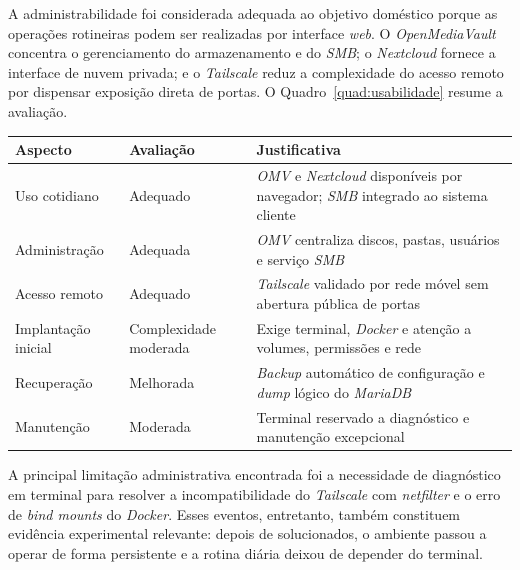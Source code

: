 A administrabilidade foi considerada adequada ao objetivo doméstico porque as operações rotineiras podem ser realizadas por interface \textit{web}. O \textit{OpenMediaVault} concentra o gerenciamento do armazenamento e do \textit{SMB}; o \textit{Nextcloud} fornece a interface de nuvem privada; e o \textit{Tailscale} reduz a complexidade do acesso remoto por dispensar exposição direta de portas. O Quadro~\ref{quad:usabilidade} resume a avaliação.

\begin{quadro}[H]
    \centering
    \small
    \renewcommand{\arraystretch}{1.15}
    \begin{tabularx}{\linewidth}{|>{\raggedright\arraybackslash}X|>{\raggedright\arraybackslash}X|>{\raggedright\arraybackslash}X|}
        \hline
        \textbf{Aspecto} & \textbf{Avaliação} & \textbf{Justificativa} \\
        \hline
        \hline
        Uso cotidiano & Adequado & \textit{OMV} e \textit{Nextcloud} disponíveis por navegador; \textit{SMB} integrado ao sistema cliente \\
        \hline
        Administração & Adequada & \textit{OMV} centraliza discos, pastas, usuários e serviço \textit{SMB} \\
        \hline
        Acesso remoto & Adequado & \textit{Tailscale} validado por rede móvel sem abertura pública de portas \\
        \hline
        Implantação inicial & Complexidade moderada & Exige terminal, \textit{Docker} e atenção a volumes, permissões e rede \\
        \hline
        Recuperação & Melhorada & \textit{Backup} automático de configuração e \textit{dump} lógico do \textit{MariaDB} \\
        \hline
        Manutenção & Moderada & Terminal reservado a diagnóstico e manutenção excepcional \\
        \hline
    \end{tabularx}
    \vspace{0.2cm}
    \fonteautoria
\end{quadro}

A principal limitação administrativa encontrada foi a necessidade de diagnóstico em terminal para resolver a incompatibilidade do \textit{Tailscale} com \textit{netfilter} e o erro de \textit{bind mounts} do \textit{Docker}. Esses eventos, entretanto, também constituem evidência experimental relevante: depois de solucionados, o ambiente passou a operar de forma persistente e a rotina diária deixou de depender do terminal.

